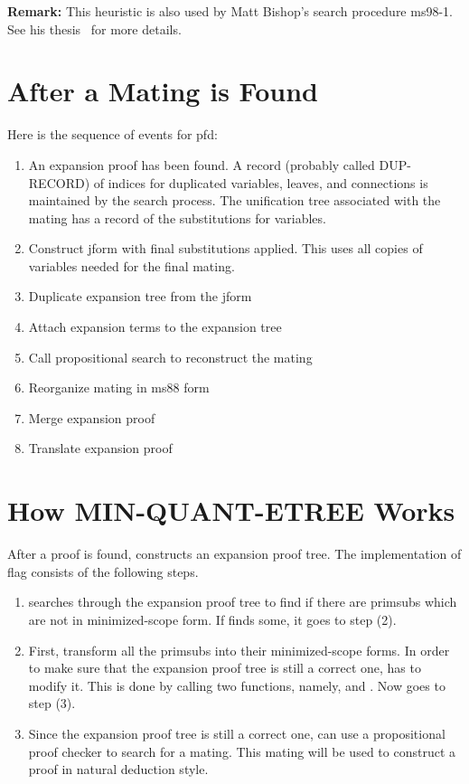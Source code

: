 {\bf Remark:}  This heuristic is also used by Matt Bishop's search
procedure ms98-1.  See his thesis~\cite{Bishop99a} for more details.

\section{After a Mating is Found}

Here is the sequence of events for pfd:

\begin{enumerate}
\item An expansion proof has been found.
A record (probably called DUP-RECORD) of indices for duplicated
variables, leaves, and connections is maintained by the search process.
The unification tree associated with the mating has a record of the
substitutions for variables.

\item Construct jform with final substitutions applied.
This uses all copies of variables needed for the final mating.

\item Duplicate expansion tree from the jform

\item Attach expansion terms to the expansion tree

\item Call propositional search to reconstruct the mating

\item Reorganize mating in ms88 form

\item Merge expansion proof

\item Translate expansion proof
\end{enumerate}

\section{How MIN-QUANT-ETREE Works}

After a proof is found, \TPS constructs an expansion proof tree.
The implementation of flag  consists of the
following steps.


\begin{enumerate}
\item \TPS searches through the expansion proof tree to find if
there are primsubs which are not in minimized-scope form.
If \TPS finds some, it goes to step (2).

\item First, \TPS transform all the primsubs into their minimized-scope 
forms. In order to make sure that the expansion proof
tree is still a correct one, \TPS has to modify it. This is
done by calling two functions, namely,  and
. Now \TPS goes to step (3).

\item Since the expansion proof tree is still a correct one, \TPS
can use a propositional proof checker to search for a mating.
This mating will be used to construct a proof in natural
deduction style.
\end{enumerate}

